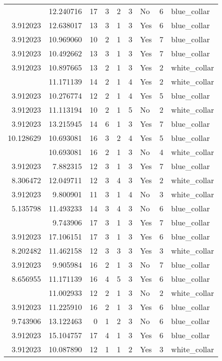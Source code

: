 \documentclass[
]{article}
\begin{document}
\begin{longtable}[t]{rrrrrllrl}
\addlinespace
7.575585 & 12.240716 & 17 & 3 & 2 & 3 & No & 6 & blue\_collar\\
3.912023 & 12.638017 & 13 & 3 & 1 & 3 & Yes & 6 & blue\_collar\\
3.912023 & 10.969060 & 10 & 2 & 1 & 3 & Yes & 7 & blue\_collar\\
3.912023 & 10.492662 & 13 & 3 & 1 & 3 & Yes & 7 & blue\_collar\\
3.912023 & 10.897665 & 13 & 2 & 1 & 3 & Yes & 2 & white\_collar\\
\addlinespace
3.912023 & 11.171139 & 14 & 2 & 1 & 4 & Yes & 2 & white\_collar\\
3.912023 & 10.276774 & 12 & 2 & 1 & 4 & Yes & 5 & blue\_collar\\
3.912023 & 11.113194 & 10 & 2 & 1 & 5 & No & 2 & white\_collar\\
3.912023 & 13.215945 & 14 & 6 & 1 & 3 & Yes & 7 & blue\_collar\\
10.128629 & 10.693081 & 16 & 3 & 2 & 4 & Yes & 5 & blue\_collar\\
\addlinespace
3.912023 & 10.693081 & 16 & 2 & 1 & 3 & No & 4 & white\_collar\\
3.912023 & 7.882315 & 12 & 3 & 1 & 3 & Yes & 7 & blue\_collar\\
8.306472 & 12.049711 & 12 & 3 & 4 & 3 & Yes & 2 & white\_collar\\
3.912023 & 9.800901 & 11 & 3 & 1 & 4 & No & 3 & white\_collar\\
5.135798 & 11.493233 & 14 & 3 & 4 & 3 & No & 6 & blue\_collar\\
\addlinespace
3.912023 & 9.743906 & 17 & 3 & 1 & 3 & Yes & 7 & blue\_collar\\
3.912023 & 17.106151 & 17 & 3 & 1 & 3 & Yes & 6 & blue\_collar\\
8.202482 & 11.462158 & 12 & 3 & 3 & 3 & Yes & 3 & white\_collar\\
3.912023 & 9.905984 & 16 & 2 & 1 & 3 & No & 7 & blue\_collar\\
8.656955 & 11.171139 & 16 & 4 & 5 & 3 & Yes & 6 & blue\_collar\\
\addlinespace
3.912023 & 11.002933 & 12 & 2 & 1 & 3 & No & 2 & white\_collar\\
3.912023 & 11.225910 & 16 & 2 & 1 & 3 & Yes & 6 & blue\_collar\\
9.743906 & 13.122463 & 0 & 1 & 2 & 3 & No & 6 & blue\_collar\\
3.912023 & 15.104757 & 17 & 4 & 1 & 3 & Yes & 6 & blue\_collar\\
3.912023 & 10.087890 & 12 & 1 & 1 & 2 & Yes & 3 & white\_collar\\

\end{longtable}
\end{document}
